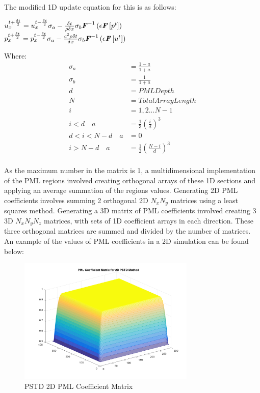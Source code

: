 The modified 1D update equation for this is as follows:\\
\begin{center}
$u^{t + \frac{\delta t}{2}}_{x} = u^{t - \frac{\delta t}{2}}_{x} \sigma_a - \frac{\delta t}{\rho \delta x} \sigma_b \textbf{\textit{F}}^{-1}\left(\epsilon \textbf{\textit{F}}\left[p^{t}\right] \right)$\\
$p^{t + \frac{\delta t}{2}}_{x} = p^{t - \frac{\delta t}{2}}_{x} \sigma_a - \frac{c^2 \rho \delta t}{\delta x} \sigma_b \textbf{\textit{F}}^{-1}\left( \epsilon \textbf{\textit{F}} \left[ u^{t} \right] \right)$\\
\end{center}
Where:\\
\begin{equation}
\begin{aligned}
\sigma_a & = \frac{1-a}{1+a} \\
\sigma_b & = \frac{1}{1 + a} \\
d & = PML Depth\\
N & = Total Array Length \\
i & = 1,2... N-1\\
i < d \quad a & = \frac{1}{3} \left( \frac{i}{d} \right)^3\\
d < i < N - d \quad a & = 0\\
i > N-d \quad a & = \frac{1}{2} \left( \frac{N - i}{d} \right) ^3 \\ 
\end{aligned}
\end{equation}

As the maximum number in the matrix is 1, a multidimensional implementation of the PML regions involved creating orthogonal arrays of these 1D sections and applying an average summation of the regions values. Generating 2D PML coefficients involves summing 2 orthogonal 2D $N_x N_y $ matrices using a least squares method. Generating a 3D matrix of PML coefficients involved creating 3 3D $N_x N_y N_z $ matrices, with sets of 1D coefficient arrays in each direction. These three orthogonal matrices are summed and divided by the number of matrices. An example of the values of PML coefficients in a 2D simulation can be found below:\\
\begin{figure}[H]
\centering
  \includegraphics[width=0.75\textwidth]{./graphics/pstd2dpmlmatrix.png}
  \caption{PSTD 2D PML Coefficient Matrix}
\end{figure}


